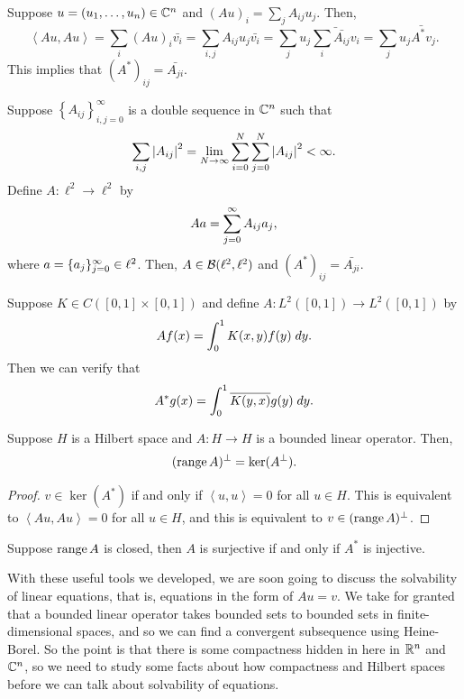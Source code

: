 \documentclass[a4paper]{article}
\renewcommand{\braket}[2]{\left\langle #1, #1 \right\rangle}
\begin{document}
\begin{eg}
Suppose $u = (u_1, \dots, u_n) \in \mathbb{C}^n$ 
and $(A u)_i = \sum_j A_{ij} u_j$.
Then, 
\[
\braket{A u}{v} = \sum_i (A u)_i \bar{v_i} 
= \sum_{i, j} A_{ij} u_j \bar{v_i} 
= \sum_j u_j \bar{\sum_i \bar{A_{ij}} v_i} 
= \sum_j u_j \bar{A^* v}_j.
\]
This implies that $(A^*)_{ij} = \bar{A_{ji}}$.
\end{eg}

\begin{eg}
Suppose $\left\{ A_{ij} \right\}_{i, j = 0}^\infty$ 
is a double sequence in $\mathbb{C}^n$ such that 
\[
\sum_{i, j} \left\lvert A_{ij}\right\rvert^2 = \lim_{N \to \infty}
\sum_{i=0}^N \sum_{j=0}^N \left\lvert A_{ij}\right\rvert^2 < \infty.
\]
Define $A : \ell^2 \to \ell^2$ by 
\[
A a = \sum_{j=0}^\infty A_{ij} a_j,
\]
where $a = \{ a_j \}_{j=0}^\infty \in \ell^2$. Then, 
$A \in \mathcal{B}(\ell^2, \ell^2)$ and 
$(A^*)_{ij} = \bar{A_{ji}}$.
\end{eg}

\begin{eg}
Suppose $K \in C([0, 1] \times [0, 1])$ and define 
$A : L^2 ([0, 1]) \to L^2 ([0, 1])$ by 
\[
A f(x) = \int_0^1 K(x, y) f(y) \; d y.
\]
Then we can verify that 
\[
A^* g(x) = \int_0^1 \overline{K(y, x)} g(y) \; d y.
\]
\end{eg}

\begin{thm}
Suppose $H$ is a Hilbert space and $A : H \to H$
is a bounded linear operator. Then, 
\[
(\operatorname{range} A)^\perp = \ker (A^\perp).
\]
\end{thm}

\begin{proof}
$v \in \ker (A^*)$ if and only if $\braket{u}{A^* v} = 0$
for all $u \in H$. This is equivalent to 
$\braket{A u}{v} = 0$ for all $u \in H$, and 
this is equivalent to $v \in (\operatorname{range} A)^\perp$.
\end{proof}

\begin{cor}
  Suppose $\operatorname{range} A$ is closed, then 
  $A$ is surjective if and only if 
  $A^*$ is injective.
\end{cor}

With these useful tools we developed,
we are soon going to discuss the solvability of linear 
equations, that is, equations in the form of $Au = v$.
We take for granted that a bounded linear operator takes 
bounded sets to bounded sets in finite-dimensional spaces, 
and so we can find a convergent subsequence using Heine-Borel. 
So the point is that there is some compactness hidden in 
here in $\mathbb{R}^n$ and $\mathbb{C}^n$, so we need to study some facts 
about how compactness and Hilbert spaces before we can talk 
about solvability of equations.
\end{document}
